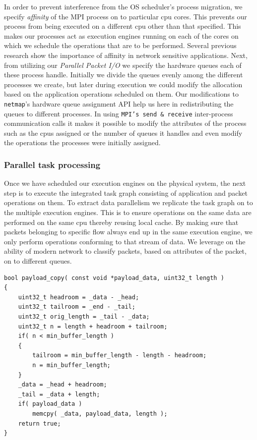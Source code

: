\documentclass[conference]{IEEEtran}
\begin{document}
In order to prevent interference from the OS scheduler's process migration, we specify \textit{affinity} of the MPI process on to particular cpu cores. This prevents our process from being executed on a different cpu other than that specified. This makes our processes act as execution engines running on each of the cores on which we schedule the operations that are to be performed. Several previous research\cite{Salehi:1996:EAS:234766.234769}\cite{1409136} show the importance of affinity in network sensitive applications. Next, from utilizing our \textit{Parallel Packet I/O} we specify the hardware queues each of these process handle. Initially we divide the queues evenly among the different processes we create, but later during execution we could modify the allocation based on the application operations scheduled on them. Our modifications to \texttt{netmap}'s hardware queue assignment API help us here in redistributing the queues to different processes. In using \texttt{MPI's send \& receive} inter-process communication calls it makes it possible to modify the attributes of the process such as the cpus assigned or the number of queues it handles and even modify the operations the processes were initially assigned.

\subsubsection{Parallel task processing}
\label{ppt}

Once we have scheduled our execution engines on the physical system, the next step is to execute the integrated task graph consisting of application and packet operations on them. To extract data parallelism we replicate the task graph on to the multiple execution engines. This is to ensure operations on the same data are performed on the same cpu thereby reusing local cache. By making sure that packets belonging to specific flow always end up in the same execution engine, we only perform operations conforming to that stream of data. We leverage on the ability of modern network to classify packets, based on attributes of the packet, on to different queues.


\begin{lstlisting}
bool payload_copy( const void *payload_data, uint32_t length )
{
    uint32_t headroom = _data - _head;
    uint32_t tailroom = _end - _tail;
    uint32_t orig_length = _tail - _data;
    uint32_t n = length + headroom + tailroom;
    if( n < min_buffer_length ) 
    {
        tailroom = min_buffer_length - length - headroom;
        n = min_buffer_length;
    }
    _data = _head + headroom;
    _tail = _data + length;
    if( payload_data )
        memcpy( _data, payload_data, length );
    return true;
}
\end{lstlisting}
\end{document}
